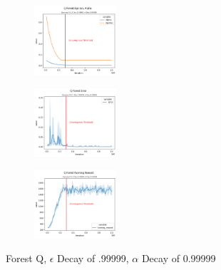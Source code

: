 \documentclass[letterpaper]{article} %
\begin{document}
\begin{figure}[!htb]
	\centering
 	\begin{subfigure}[b]{0.175\textwidth}
		\includegraphics[width=1.2in]{Figures/Q_Forest_Epsilon__Alpha_Gamma_0_9__E_Dec_0_99999__A_Dec_0_99999.png}
  	\end{subfigure}%
	 \begin{subfigure}[b]{0.175\textwidth}
		\includegraphics[width=1.2in]{Figures/Q_Forest_Error_Gamma_0_9__E_Dec_0_99999__A_Dec_0_99999.png}
  	\end{subfigure}%
	\begin{subfigure}[b]{0.175\textwidth}
		\includegraphics[width=1.2in]{Figures/Q_Forest_Running_Reward_Gamma_0_9__E_Dec_0_99999__A_Dec_0_99999.png}
  	\end{subfigure}
\caption{Forest Q,  $\epsilon$ Decay of .99999, $\alpha$ Decay of 0.99999}
\label{fig:forest_q_e_99999_a_99999_rewards}
\end{figure}
\end{document}
